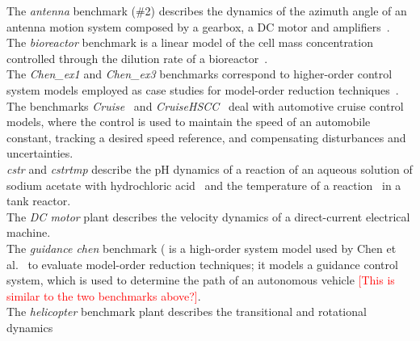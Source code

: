 \documentclass[twocolumn]{autart}    %
\renewcommand{\note}[1]{\textcolor{red}{[#1]}}
\begin{document}
The \textit{antenna} benchmark (\#2) 
describes the dynamics of the azimuth angle of an antenna 
motion system composed by a gearbox, a DC motor and amplifiers~\cite{gajic2008optimal}. \\
The \textit{bioreactor} benchmark is a linear model 
of the cell mass concentration controlled through the dilution rate of a bioreactor~\cite{bioreactor}.\\ 
%
The \textit{Chen\_ex1} and \textit{Chen\_ex3}
benchmarks correspond to higher-order control system 
models employed as case studies for model-order reduction techniques~\cite{CHEN1979389}.  \\
%
The benchmarks \textit{Cruise}~\cite{Franklin15} and \textit{CruiseHSCC}~\cite{Astrom08} deal with automotive cruise control models, 
where the control is used to maintain the speed of an automobile constant, 
tracking a desired speed reference, and compensating disturbances and uncertainties. \\ %
\textit{cstr}  and \textit{cstrtmp}  describe the pH dynamics of a reaction 
of an aqueous solution of sodium acetate with hydrochloric acid~\cite{cstr} and 
the temperature of a reaction~\cite{astrom2006advanced} in a 
tank reactor. \\ 
The \textit{DC motor} plant  describes the velocity 
dynamics of a 
direct-current electrical machine. \\ 
%
The \textit{guidance chen} benchmark ( is a high-order system model used by Chen et al.~\cite{CHEN1979389} to evaluate 
model-order reduction techniques; it models a guidance control system, 
which is used to determine the path of an autonomous vehicle \note{This is similar to the two benchmarks above?}. \\ 
The \textit{helicopter} benchmark plant  describes the transitional and rotational dynamics 
\end{document}
